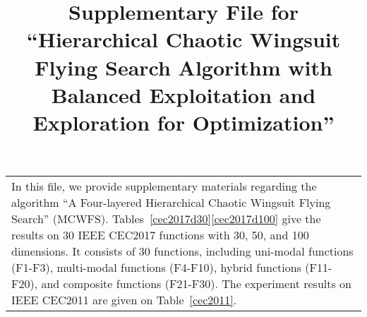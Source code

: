 \documentclass[paper]{ieice}
\title{Supplementary File for ``Hierarchical Chaotic Wingsuit Flying Search Algorithm with Balanced Exploitation and Exploration for Optimization''}
\begin{document}
\maketitle
\vspace{-7mm}
\begin{table}[t]
	\large
	\begin{tabular}{p{17cm}}
		\quad \quad In this file, we provide supplementary materials regarding the algorithm ``A Four-layered Hierarchical Chaotic Wingsuit Flying Search'' (MCWFS). Tables~\ref{cec2017d30}\textemdash\ref{cec2017d100} give the results on 30 IEEE CEC2017 functions with 30, 50, and 100 dimensions. It consists of 30 functions, including uni-modal functions (F1-F3), multi-modal functions (F4-F10), hybrid functions (F11-F20), and composite functions (F21-F30).  The experiment results on IEEE CEC2011 are given on Table~\ref{cec2011}.
	\end{tabular}
	\vspace{-7mm}
\end{table}
\end{document}
